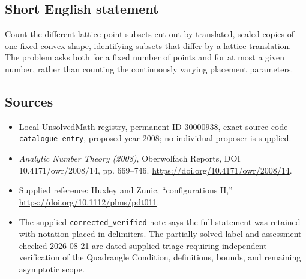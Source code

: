 \documentclass[11pt]{article}
\begin{document}
\subsection{Short English statement}
Count the different lattice-point subsets cut out by translated, scaled copies of one fixed convex shape, identifying subsets that differ by a lattice translation. The problem asks both for a fixed number of points and for at most a given number, rather than counting the continuously varying placement parameters.
\subsection{Sources}
\begin{itemize}
\item Local UnsolvedMath registry, permanent ID \(30000938\), exact source code \texttt{catalogue entry}, proposed year 2008; no individual proposer is supplied.
\item \emph{Analytic Number Theory (2008)}, Oberwolfach Reports, DOI 10.4171/owr/2008/14, pp. 669--746. \url{https://doi.org/10.4171/owr/2008/14}.
\item Supplied reference: Huxley and Zunic, ``configurations II,'' \url{https://doi.org/10.1112/plms/pdt011}.
\item The supplied \texttt{corrected\_verified} note says the full statement was retained with notation placed in delimiters. The partially solved label and assessment checked 2026-08-21 are dated supplied triage requiring independent verification of the Quadrangle Condition, definitions, bounds, and remaining asymptotic scope.
\end{itemize}
\end{document}
